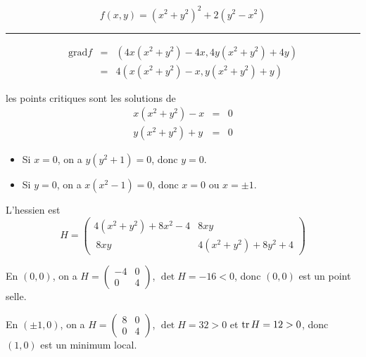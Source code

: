 \documentclass[a4paper,12pt]{article}
\def\tr{\mathop{\rm tr}}
\begin{document}
$$f(x,y) = (x^2 + y^2)^2  + 2(y^2 - x^2)$$


\hrule

\begin{eqnarray*}
 \mathrm{grad} f &=& (4x(x^2 + y^2) - 4x, 4y(x^2 + y^2) + 4y) \\
		 &=& 4(x(x^2 +
y^2) - x, y(x^2 + y^2) + y)
\end{eqnarray*}


les points critiques sont les solutions de 
\begin{eqnarray*}
x(x^2 + y^2) - x &=& 0 \\
y(x^2 + y^2) + y &=& 0
\end{eqnarray*}

\begin{itemize}
	\item	
Si $x = 0$, on a $y(y^2 + 1) = 0$, donc $y = 0$.
\item
Si $y = 0$, on a $x(x^2 - 1) = 0$, donc $x = 0$ ou $x= \pm 1$.
\end{itemize}


L'hessien est
$$H = \begin{pmatrix} 4(x^2 + y^2) + 8x^2 - 4& 8xy \\ 
\ 8xy  & 4(x^2 + y^2) + 8y^2 + 4 \end{pmatrix}$$


	En $(0,0)$, on a $H = \begin{pmatrix} -4 & 0 \\ 0 & 4
	\end{pmatrix}$, 
	$\det H = -16 < 0$, donc $(0,0)$ est un point selle.

	En $(\pm1,0)$, on a $H = \begin{pmatrix} 8 & 0 \\ 0 & 4
	\end{pmatrix}$,
	$\det H = 32 > 0$ et $\tr H = 12 > 0$, donc $(1,0)$
	est un minimum local.
\end{document}
